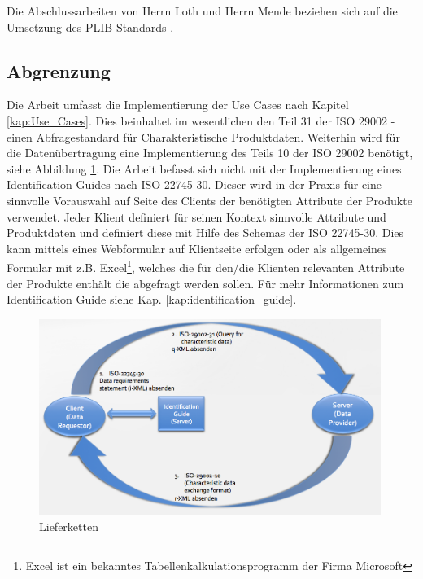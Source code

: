 Die Abschlussarbeiten von Herrn Loth und Herrn Mende beziehen sich auf die Umsetzung des PLIB Standards  \citep[Vergl.][]{iso13584-42}.

\subsection{Abgrenzung}

Die Arbeit umfasst die Implementierung der Use Cases nach Kapitel \ref{kap:Use_Cases}. Dies beinhaltet im wesentlichen den Teil 31 der ISO 29002 - einen Abfragestandard für Charakteristische Produktdaten. 
Weiterhin wird für die Datenübertragung eine Implementierung des Teils 10 der ISO 29002 benötigt, siehe Abbildung \ref{fig:lieferketten}. 
Die Arbeit befasst sich nicht mit der Implementierung eines Identification Guides nach ISO 22745-30. Dieser wird in der Praxis für eine sinnvolle Vorauswahl auf Seite des Clients der benötigten Attribute der Produkte verwendet. Jeder Klient definiert für seinen Kontext sinnvolle Attribute und Produktdaten und definiert diese mit Hilfe des Schemas der ISO 22745-30. Dies kann mittels eines Webformular auf Klientseite erfolgen oder als allgemeines Formular mit z.B. Excel\footnote{Excel ist ein bekanntes Tabellenkalkulationsprogramm der Firma Microsoft}, welches die für den/die Klienten relevanten Attribute der Produkte enthält die abgefragt werden sollen. Für mehr Informationen zum Identification Guide siehe Kap. \ref{kap:identification_guide}.

\begin{figure}[htbp]
	\centering
		\includegraphics[width=0.99\textwidth]{images/lieferketten_plib.png}
		\caption[Lieferketten]{Lieferketten\footnotemark}
	\label{fig:lieferketten}
\end{figure}

